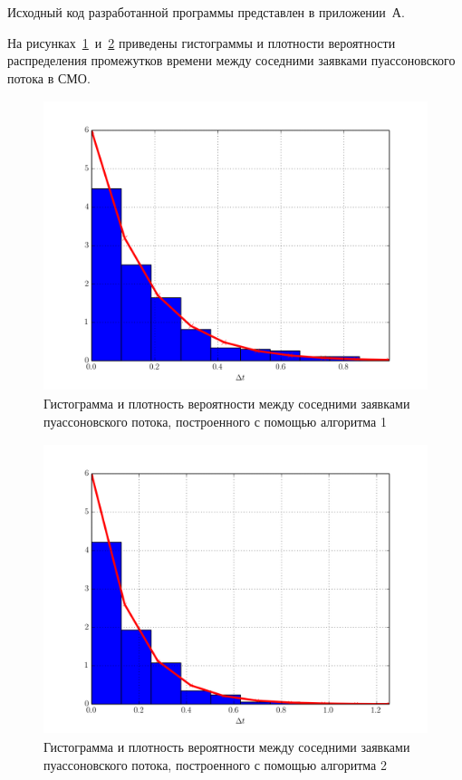 Исходный код разработанной программы представлен в приложении~А.

\newpage

На рисунках~\ref{pic:hist_1}~и~\ref{pic:hist_2} приведены гистограммы и плотности вероятности распределения промежутков времени между соседними заявками пуассоновского потока в СМО.

\begin{figure}[h!]
  \centering
  \includegraphics[width=150mm, height=85mm]{pic/hist_1}
  \caption{Гистограмма и плотность вероятности между соседними заявками пуассоновского потока, построенного с помощью алгоритма 1}
  \label{pic:hist_1}
\end{figure}

\begin{figure}[h!]
  \centering
  \includegraphics[width=150mm, height=85mm]{pic/hist_2}
  \caption{Гистограмма и плотность вероятности между соседними заявками пуассоновского потока, построенного с помощью алгоритма 2}
  \label{pic:hist_2}
\end{figure}
